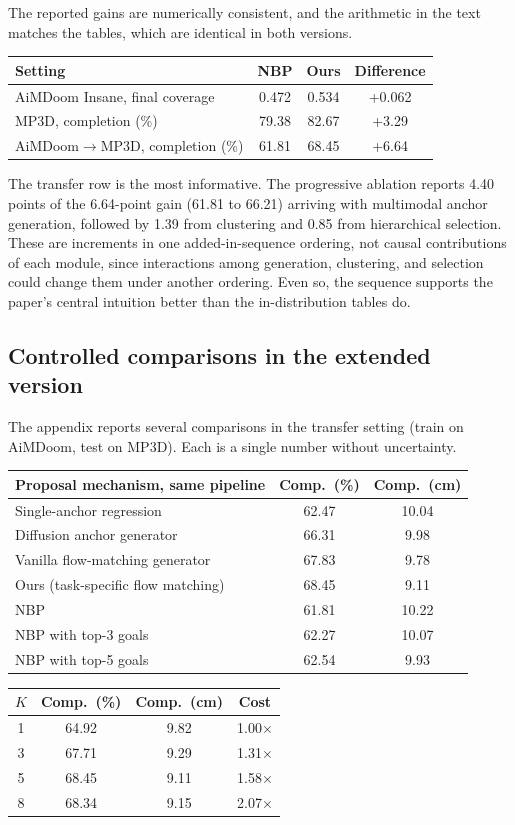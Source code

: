 \documentclass[11pt]{article}
\theoremstyle{plain}
\theoremstyle{remark}
\begin{document}
The reported gains are numerically consistent, and the arithmetic in the text matches the tables, which are identical in both versions.

\begin{center}
\small
\begin{tabular}{lccc}
\toprule
Setting & NBP & Ours & Difference\\
\midrule
AiMDoom Insane, final coverage & 0.472 & 0.534 & +0.062\\
MP3D, completion (\%) & 79.38 & 82.67 & +3.29\\
AiMDoom$\to$MP3D, completion (\%) & 61.81 & 68.45 & +6.64\\
\bottomrule
\end{tabular}
\end{center}

The transfer row is the most informative. The progressive ablation reports 4.40 points of the 6.64-point gain (61.81 to 66.21) arriving with multimodal anchor generation, followed by 1.39 from clustering and 0.85 from hierarchical selection. These are increments in one added-in-sequence ordering, not causal contributions of each module, since interactions among generation, clustering, and selection could change them under another ordering. Even so, the sequence supports the paper's central intuition better than the in-distribution tables do.

\subsection{Controlled comparisons in the extended version}

The appendix reports several comparisons in the transfer setting (train on AiMDoom, test on MP3D). Each is a single number without uncertainty.

\begin{center}
\small
\begin{tabular}{lcc}
\toprule
Proposal mechanism, same pipeline & Comp.\ (\%) & Comp.\ (cm)\\
\midrule
Single-anchor regression & 62.47 & 10.04\\
Diffusion anchor generator & 66.31 & 9.98\\
Vanilla flow-matching generator & 67.83 & 9.78\\
Ours (task-specific flow matching) & 68.45 & 9.11\\
\midrule
NBP & 61.81 & 10.22\\
NBP with top-3 goals & 62.27 & 10.07\\
NBP with top-5 goals & 62.54 & 9.93\\
\bottomrule
\end{tabular}
\qquad
\begin{tabular}{cccc}
\toprule
$K$ & Comp.\ (\%) & Comp.\ (cm) & Cost\\
\midrule
1 & 64.92 & 9.82 & 1.00$\times$\\
3 & 67.71 & 9.29 & 1.31$\times$\\
5 & 68.45 & 9.11 & 1.58$\times$\\
8 & 68.34 & 9.15 & 2.07$\times$\\
\bottomrule
\end{tabular}
\end{center}
\end{document}
